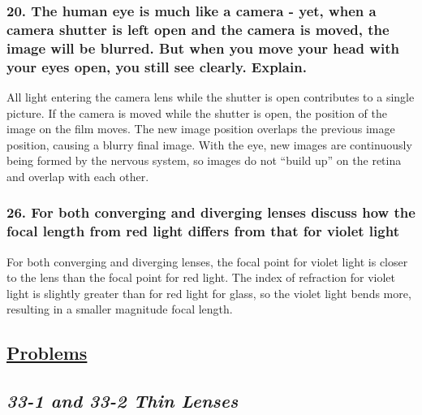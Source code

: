 \documentclass{article}
\begin{document}
\subsubsection*{
    20. The human eye is much like a camera - yet, when a camera shutter is left open
    and the camera is moved, the image will be blurred. But when you move your head
    with your eyes open, you still see clearly. Explain.
}
All light entering the camera lens while the shutter is open contributes to a single picture. If the
camera is moved while the shutter is open, the position of the image on the film moves. The new
image position overlaps the previous image position, causing a blurry final image. With the eye, new
images are continuously being formed by the nervous system, so images do not “build up” on the
retina and overlap with each other.
\subsubsection*{
    26. For both converging and diverging lenses discuss how the focal length
        from red light differs from that for violet light 
}
For both converging and diverging lenses, the focal point for violet light is closer to the lens than the
focal point for red light. The index of refraction for violet light is slightly greater than for red light
for glass, so the violet light bends more, resulting in a smaller magnitude focal length.
\newpage
\begin{center}
    \section*{\textbf{\underline {Problems}}}
    \subsection*{\textbf{\textit{33-1 and 33-2 Thin Lenses}}}
\end{center}
\end{document}
